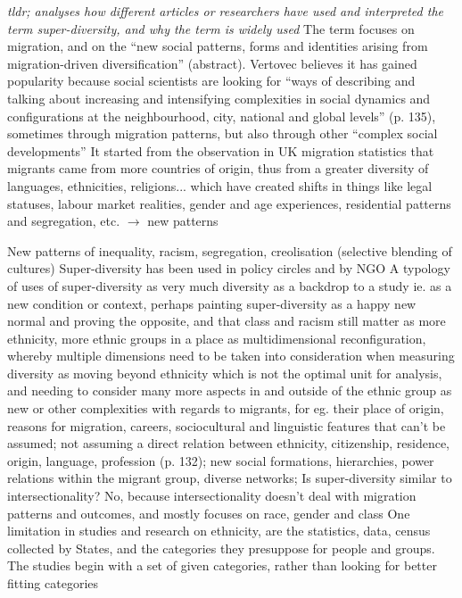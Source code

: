 \documentclass{article}
\newcommand{\alignedmarginpar}[1]{%
        \marginpar{\raggedright\small #1}
    }
\begin{document}
\begin{outline}
	\1 \textit{tldr; analyses how different articles or researchers have used and interpreted the term super-diversity, and why the term is widely used}
	\1 The term focuses on migration, and on the ``new social patterns, forms and identities arising from migration-driven diversification'' (abstract). Vertovec believes it has gained popularity because social scientists are looking for ``ways of describing and talking about increasing and intensifying complexities in social dynamics and configurations at the neighbourhood, city, national and global levels'' (p. 135), sometimes through migration patterns, but also through other ``complex social developments''
		\2 It started from the observation in UK migration statistics that migrants came from more countries of origin, thus from a greater diversity of languages, ethnicities, religions... which have created shifts in things like legal statuses, labour market realities, gender and age experiences, residential patterns and segregation, etc. $\rightarrow$ new patterns\alignedmarginpar{change, socio-spatial disparities, everyday life}
		\2 New patterns of inequality, racism, segregation, creolisation (selective blending of cultures)
	\1 Super-diversity has been used in policy circles and by NGO
	\1 A typology of uses of super-diversity 
		\2 as very much diversity
		\2 as a backdrop to a study ie. as a new condition or context, perhaps painting super-diversity as a happy new normal and proving the opposite, and that class and racism still matter
		\2 as more ethnicity, more ethnic groups in a place
		\2 as multidimensional reconfiguration, whereby multiple dimensions need to be taken into consideration when measuring diversity
		\2 as moving beyond ethnicity which is not the optimal unit for analysis, and needing to consider many more aspects in and outside of the ethnic group
		\2 as new or other complexities with regards to migrants, for eg. their place of origin, reasons for migration, careers, sociocultural and linguistic features that can't be assumed; not assuming a direct relation between ethnicity, citizenship, residence, origin, language, profession (p. 132); new social formations, hierarchies, power relations within the migrant group, diverse networks;
	\1 Is super-diversity similar to intersectionality? No, because intersectionality doesn't deal with migration patterns and outcomes, and mostly focuses on race, gender and class
	\1 One limitation in studies and research on ethnicity, are the statistics, data, census collected by States, and the categories they presuppose for people and groups. The studies begin with a set of given categories, rather than looking for better fitting categories
	\1 
\end{outline}
\end{document}
